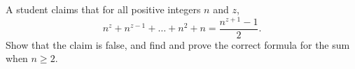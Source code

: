 A student claims that for all positive integers $n$ and $z$,
\[
n^z+n^{z-1}+\dots+n^2+n=\dfrac{n^{z+1}-1}{2}.
\]
Show that the claim is false, and find and prove the correct formula for the sum when $n\ge2$.
